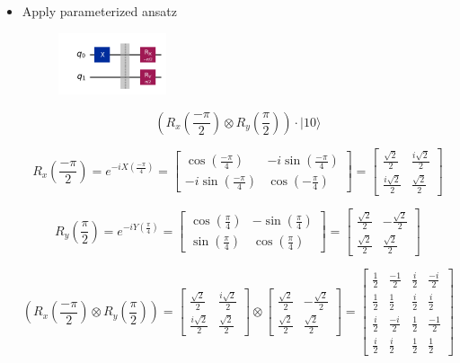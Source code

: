 \documentclass{article}
\begin{document}
\begin{itemize}
    \item Apply parameterized ansatz
    \begin{figure}[H]
        \centering
        \includegraphics[width=0.3\textwidth, height=0.15\textheight]{ansatz1.png}
    \end{figure}
    \[
    \left(R_x(\frac{-\pi}{2}) \otimes R_y(\frac{\pi}{2})\right) \cdot |10 \rangle 
    \]

    \[
        R_x(\frac{-\pi}{2}) = e^{-i X (\frac{-\pi}{4})} = \begin{bmatrix}
            \cos(\frac{-\pi}{4}) & -i\sin(\frac{-\pi}{4})\\
            -i\sin(\frac{-\pi}{4}) & \cos(-\frac{\pi}{4})
        \end{bmatrix}  
        = 
        \begin{bmatrix}
            \frac{\sqrt{2}}{2} & \frac{i \sqrt{2}}{2} \\
            \frac{i \sqrt{2}}{2} & \frac{\sqrt{2}}{2}
        \end{bmatrix}
    \]

    \[
        R_y(\frac{\pi}{2}) = e^{ -i Y(\frac{\pi}{4})} = 
        \begin{bmatrix}
            \cos(\frac{\pi}{4}) & -\sin(\frac{\pi}{4})\\
            \sin(\frac{\pi}{4}) & \cos(\frac{\pi}{4})
        \end{bmatrix} =
        \begin{bmatrix}
            \frac{\sqrt{2}}{2} & -\frac{\sqrt{2}}{2} \\
            \frac{\sqrt{2}}{2} & \frac{\sqrt{2}}{2}
        \end{bmatrix}
    \]

    \[
        \left(R_x(\frac{-\pi}{2}) \otimes R_y(\frac{\pi}{2})\right) = 
        \begin{bmatrix}
            \frac{\sqrt{2}}{2} & \frac{i \sqrt{2}}{2} \\
            \frac{i \sqrt{2}}{2} & \frac{\sqrt{2}}{2}
        \end{bmatrix} 
        \otimes
        \begin{bmatrix}
            \frac{\sqrt{2}}{2} & -\frac{\sqrt{2}}{2} \\
            \frac{\sqrt{2}}{2} & \frac{\sqrt{2}}{2}
        \end{bmatrix} =
        \begin{bmatrix}
            \frac{1}{2} & \frac{-1}{2} & \frac{i}{2} & \frac{-i}{2} \\
            \frac{1}{2} & \frac{1}{2} & \frac{i}{2}  & \frac{i}{2} \\
            \frac{i}{2} & \frac{-i}{2} & \frac{1}{2} & \frac{-1}{2} \\
            \frac{i}{2}  & \frac{i}{2} & \frac{1}{2} & \frac{1}{2} 
        \end{bmatrix}
    \]


\end{itemize}
\end{document}
